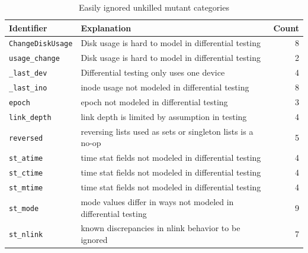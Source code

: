\documentclass{svjour3}
\begin{document}
\begin{table}
\caption{Easily ignored unkilled mutant categories}
{\scriptsize
\begin{tabular}{l|l|r}
Identifier & Explanation & Count \\
\hline
{\tt ChangeDiskUsage} & Disk usage is hard to model in differential
                        testing & 8 \\
{\tt usage\_change} & Disk usage is hard to model in differential
                      testing & 2 \\
{\tt \_last\_dev} & Differential testing only uses one device & 4\\
{\tt \_last\_ino} & inode usage not modeled in differential testing &
                                                                      8\\
{\tt epoch} & epoch not modeled in differential testing & 3\\
{\tt link\_depth} & link depth is limited by assumption in testing & 4\\
{\tt reversed} & reversing lists used as sets or singleton lists is a
                 no-op & 5\\
{\tt st\_atime} & time stat fields not modeled in differential testing
                         & 4 \\
{\tt st\_ctime} & time stat fields not modeled in differential testing
                         & 4\\
{\tt st\_mtime} & time stat fields not modeled in differential testing
                         & 4\\
{\tt st\_mode} & mode values differ in ways not modeled in
                 differential testing
                         & 9\\
{\tt st\_nlink} & known discrepancies in nlink behavior to be ignored
                         & 7\\
\end{tabular}
}
\label{table:ignore}
\end{table}
\end{document}
